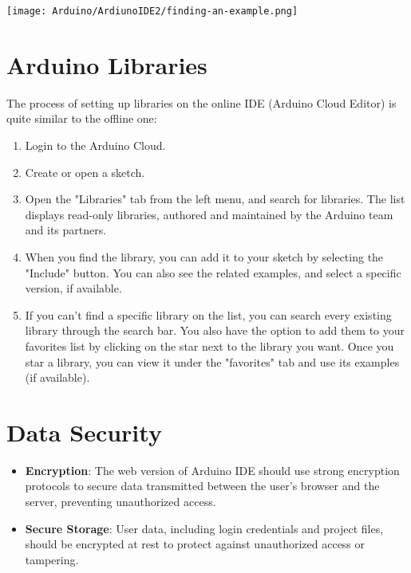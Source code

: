 	\begin{center}
		\texttt{[image: Arduino/ArdiunoIDE2/finding-an-example.png]}
		\label{Arduino Web Editor: Finding an Example}
	\end{center}


\section{Arduino Libraries}

The process of setting up libraries on the online IDE (Arduino Cloud Editor) is quite similar to the offline one: \cite{arduinoLibraries:2025,arduinoCloud:2025}

\begin{enumerate}
	\item Login to the Arduino Cloud.
	\item Create or open a sketch.
	\item Open the "Libraries" tab from the left menu, and search for libraries. The list displays read-only libraries, authored and maintained by the Arduino team and its partners.
	\item When you find the library, you can add it to your sketch by selecting the "Include" button. You can also see the related examples, and select a specific version, if available.
	\item If you can't find a specific library on the list, you can search every existing library through the search bar. You also have the option to add them to your favorites list by clicking on the star next to the library you want. Once you star a library, you can view it under the "favorites" tab and use its examples (if available).
\end{enumerate} 

\section{Data Security}
\begin{itemize}
	\item \textbf{Encryption}: The web version of Arduino IDE should use strong encryption protocols to secure data transmitted between the user's browser and the server, preventing unauthorized access.
	\item \textbf{Secure Storage}: User data, including login credentials and project files, should be encrypted at rest to protect against unauthorized access or tampering.
\end{itemize}

